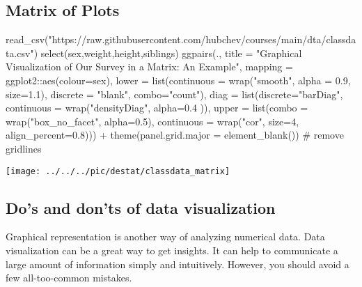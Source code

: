 \subsection*{Matrix of Plots}
\begin{rblock1}
read_csv("https://raw.githubusercontent.com/hubchev/courses/main/dta/classdata.csv") %
	select(sex,weight,height,siblings) %
	ggpairs(.,
	title = "Graphical Visualization of Our Survey in a Matrix: An Example", 
	mapping = ggplot2::aes(colour=sex), 
	lower = list(continuous = wrap("smooth", alpha = 0.9, size=1.1), 
	discrete = "blank", combo="count"), 
	diag = list(discrete="barDiag", 
	continuous = wrap("densityDiag", alpha=0.4 )), 
	upper = list(combo = wrap("box_no_facet", alpha=0.5),
	continuous = wrap("cor", size=4, align_percent=0.8))) + 
	theme(panel.grid.major = element_blank())    # remove gridlines 
\end{rblock1}

\begin{center}
\texttt{[image: ../../../pic/destat/classdata\_matrix]}
\end{center}



\subsection*{Do's and don'ts of data visualization}

 Graphical representation is another way of analyzing numerical
data.
Data visualization can be a great way to get insights. It can help to communicate a large amount of information simply and intuitively. However, you should avoid a few all-too-common mistakes.



